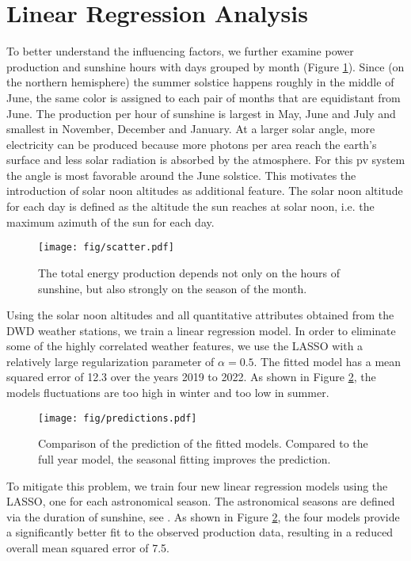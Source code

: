\documentclass{article}
\begin{document}
\section{Linear Regression Analysis}
To better understand the influencing factors, we further examine power production and sunshine hours with days grouped by month (Figure \ref{fig:scatter_months}). Since (on the northern hemisphere) the summer solstice happens roughly in the middle of June, the same color is assigned to each pair of months that are equidistant from June. The production per hour of sunshine is largest in May, June and July and smallest in November, December and January. At a larger solar angle, more electricity can be produced because more photons per area reach the earth's surface and less solar radiation is absorbed by the atmosphere. For this pv system the angle is most favorable around the June solstice. This motivates the introduction of solar noon altitudes as additional feature. The solar noon altitude for each day is defined as the altitude the sun reaches at solar noon, i.e. the maximum azimuth of the sun for each day. 

\begin{figure}[H]
	\texttt{[image: fig/scatter.pdf]}
	\caption{The total energy production depends not only on the hours of sunshine, but also strongly on the season of the month.}\label{fig:scatter_months}
\end{figure}

Using the solar noon altitudes and all quantitative attributes obtained from the DWD weather stations, we train a linear regression model. In order to eliminate some of the highly correlated weather features, we use the LASSO with a relatively large regularization parameter of $\alpha = 0.5$. The fitted model has a mean squared error of 12.3 over the years 2019 to 2022. As shown in Figure \ref{fig:predictions}, the models fluctuations are too high in winter and too low in summer.

\begin{figure}
	\texttt{[image: fig/predictions.pdf]}
	\caption{Comparison of the prediction of the fitted models. Compared to the full year model, the seasonal fitting improves the prediction.}\label{fig:predictions}
\end{figure}

To mitigate this problem, we train four new linear regression models using the LASSO, one for each astronomical season. The astronomical seasons are defined via the duration of sunshine, see \cite{MS}. As shown in Figure \ref{fig:predictions}, the four models provide a significantly better fit to the observed production data, resulting in a reduced overall mean squared error of 7.5.
\end{document}
